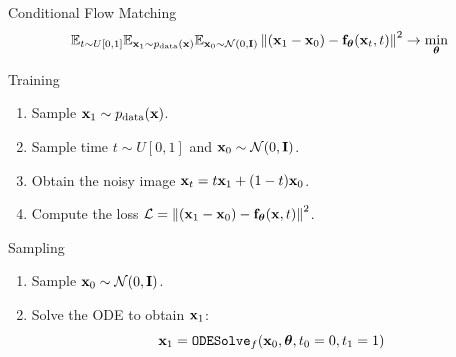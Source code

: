 \documentclass{beamer}
\begin{document}
\begin{frame}{Conditional Flow Matching}
	\vspace{-0.3cm}
	\[
	 \mathbb{E}_{t \sim U[0, 1]} \mathbb{E}_{\mathbf{x}_1 \sim p_{\text{data}}(\mathbf{x})} \mathbb{E}_{\mathbf{x}_0 \sim \mathcal{N}(0, \mathbf{I})}\left\| (\mathbf{x}_1 - \mathbf{x}_0) - \mathbf{f}_{\boldsymbol{\theta}}(\mathbf{x}_t, t) \right\|^2  \rightarrow \min_{\boldsymbol{\theta}}
	\]
	\begin{block}{Training}
		\begin{enumerate}
			\item Sample $\mathbf{x}_1 \sim p_{\text{data}}(\mathbf{x})$.
			\item Sample time $t \sim U[0, 1]$ and $\mathbf{x}_0 \sim \mathcal{N}(0, \mathbf{I})$.
			\item Obtain the noisy image $\mathbf{x}_t = t \mathbf{x}_1 + (1 - t) \mathbf{x}_0$.
			\item Compute the loss $ \mathcal{L} = \left\| (\mathbf{x}_1 - \mathbf{x}_0) - \mathbf{f}_{\boldsymbol{\theta}}(\mathbf{x}, t) \right\|^2 $.
		\end{enumerate}
	\end{block}
	\eqpause
	\vspace{-0.3cm}
	\begin{block}{Sampling}
		\begin{enumerate}
			\item Sample $\mathbf{x}_0 \sim \mathcal{N}(0, \mathbf{I})$.
			\item Solve the ODE to obtain $\mathbf{x}_1$:
			\[
				\mathbf{x}_1 = \texttt{ODESolve}_f(\mathbf{x}_0, \boldsymbol{\theta}, t_0=0, t_1=1)
			\]
		\end{enumerate}
	\end{block}
\end{frame}
\end{document}
